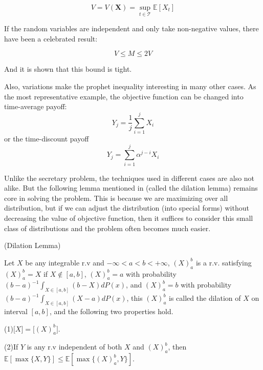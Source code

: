 \documentclass[bachelor]{thuthesis}
\begin{document}
\begin{appendix}
\[V=V(\textbf{X})=\sup_{t\in \mathcal{T}}\mathbb{E}[X_t]\]

If the random variables are independent and only take non-negative values, there have been a celebrated result:

\[V\le M\le 2V\]

And it is shown that this bound is tight.

Also, variations make the prophet inequality interesting in many other cases. As the most representative example, the objective function can be changed into time-average payoff:
\[Y_j=\frac{1}{j}\sum_{i=1}^{j}X_i\]
or the time-discount payoff
\[Y_j=\sum_{i=1}^{j} \alpha^{j-i}X_i\]

Unlike the secretary problem, the techniques used in different cases are also not alike. But the following lemma mentioned in \cite{prophet} (called the dilation lemma) remains core in solving the problem. This is because we are maximizing over all distribution, but if we can adjust the distribution (into special forms) without decreasing the value of objective function, then it suffices to consider this small class of distributions and the problem often becomes much easier.

\begin{lemma}(Dilation Lemma)

Let $X$ be any integrable r.v and $-\infty<a<b<+\infty$, $(X)_a^b$ is a r.v. satisfying $(X)_a^b=X$ if $X\notin [a,b]$, $(X)_a^b=a$ with probability $(b-a)^{-1}\int_{X\in [a,b]}(b-X)dP(x)$, and $(X)_a^b=b$ with probability $(b-a)^{-1}\int_{X\in [a,b]}(X-a)dP(x)$, this $(X)_a^b$ is called the dilation of $X$ on interval $[a,b]$, and the following two properties hold.

(1)$\mathbb[X]=\mathbb[(X)_a^b]$.

(2)If $Y$ is any r.v independent of both $X$ and $(X)_a^b$, then $\mathbb{E}[\max\{X,Y\}]\le \mathbb{E}[\max\{(X)_a^b,Y\}]$.

\end{lemma}
\end{appendix}


%
\end{document}

